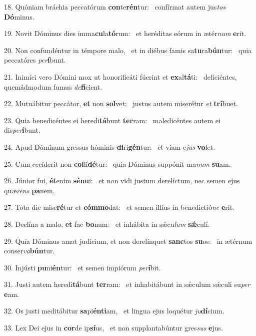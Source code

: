18. Quóniam bráchia peccatórum \textbf{con}te\textbf{rén}tur: \ast\  confírmat autem jus\textit{tos} \textbf{Dó}minus.\

19. Novit Dóminus dies imma\textbf{cu}la\textbf{tó}rum: \ast\  et heréditas eórum in ætér\textit{num} \textbf{e}rit.\

20. Non confundéntur in témpore malo, \dag\  et in diébus famis sa\textbf{tu}ra\textbf{bún}tur: \ast\  quia peccatóres \textit{per}\textbf{í}bunt.\

21. Inimíci vero Dómini mox ut honorificáti fúerint et \textbf{ex}al\textbf{tá}ti: \ast\  deficiéntes, quemádmodum fumus \textit{de}\textbf{fí}cient.\

22. Mutuábitur peccátor, \textbf{et} non \textbf{sol}vet: \ast\  justus autem miserétur \textit{et} \textbf{trí}buet.\

23. Quia benedicéntes ei heredi\textbf{tá}bunt \textbf{ter}ram: \ast\  maledicéntes autem ei dis\textit{per}\textbf{í}bunt.\

24. Apud Dóminum gressus hóminis \textbf{di}ri\textbf{gén}tur: \ast\  et viam e\textit{jus} \textbf{vo}let.\

25. Cum cecíderit non \textbf{col}li\textbf{dé}tur: \ast\  quia Dóminus suppónit ma\textit{num} \textbf{su}am.\

26. Júnior fui, \textbf{ét}enim \textbf{sé}\textbf{nu}i: \ast\  et non vidi justum derelíctum, nec semen ejus quæ\textit{rens} \textbf{pa}nem.\

27. Tota die mise\textbf{ré}tur et \textbf{cóm}\textbf{mo}dat: \ast\  et semen illíus in benedictió\textit{ne} \textbf{e}rit.\

28. Declína a malo, \textbf{et} fac \textbf{bo}num: \ast\  et inhábita in sǽcu\textit{lum} \textbf{sǽ}culi.\

29. Quia Dóminus amat judícium, et non derelínquet \textbf{sanc}tos \textbf{su}os: \ast\  in ætérnum conser\textit{va}\textbf{bún}tur.\

30. Injústi \textbf{pu}ni\textbf{én}tur: \ast\  et semen impiórum \textit{per}\textbf{í}bit.\

31. Justi autem heredi\textbf{tá}bunt \textbf{ter}ram: \ast\  et inhabitábunt in sǽculum sǽculi su\textit{per} \textbf{e}am.\

32. Os justi meditábitur \textbf{sa}pi\textbf{én}\textbf{ti}am, \ast\  et lingua ejus loquétur \textit{ju}\textbf{dí}cium.\

33. Lex Dei ejus in \textbf{cor}de ip\textbf{sí}us, \ast\  et non supplantabúntur gres\textit{sus} \textbf{e}jus.\

